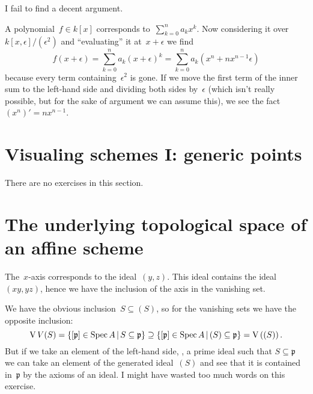 \begin{exercise}
  \label{exercise:42q}
  I fail to find a decent argument.
\end{exercise}

\begin{exercise}
  A polynomial~$f\in k[x]$ corresponds to~$\sum_{k=0}^na_kx^k$. Now considering it over~$k[x,\epsilon]/(\epsilon^2)$ and ``evaluating'' it at~$x+\epsilon$ we find
  \begin{equation}
    f(x+\epsilon)=\sum_{k=0}^na_k(x+\epsilon)^k=\sum_{k=0}^na_k\left( x^n+nx^{n-1}\epsilon \right)
  \end{equation}
  because every term containing~$\epsilon^2$ is gone. If we move the first term of the inner sum to the left-hand side and dividing both sides by~$\epsilon$ (which isn't really possible, but for the sake of argument we can assume this), we see the fact~$(x^n)'=nx^{n-1}$.
\end{exercise}


\section{Visualing schemes I: generic points}

There are no exercises in this section.


\section{The underlying topological space of an affine scheme}

\begin{exercise}
  The~$x$\nobreakdash-axis corresponds to the ideal~$(y,z)$. This ideal contains the ideal~$(xy,yz)$, hence we have the inclusion of the axis in the vanishing set.
\end{exercise}

\begin{exercise}
  We have the obvious inclusion~$S\subseteq(S)$, so for the vanishing sets we have the opposite inclusion:
  \begin{equation}
    \operatorname{V}{V}(S)=\left\{ [\mathfrak{p}]\in\operatorname{Spec} A\,|\, S\subseteq\mathfrak{p} \right\}\supseteq\left\{ [\mathfrak{p}]\in\operatorname{Spec} A\,|\, (S)\subseteq\mathfrak{p} \right\}=\operatorname{V}\left( (S) \right).
  \end{equation}
  But if we take an element of the left-hand side, \ie, a prime ideal such that $S\subseteq\mathfrak{p}$ we can take an element of the generated ideal~$(S)$ and see that it is contained in~$\mathfrak{p}$ by the axioms of an ideal. I might have wasted too much words on this exercise.
\end{exercise}

